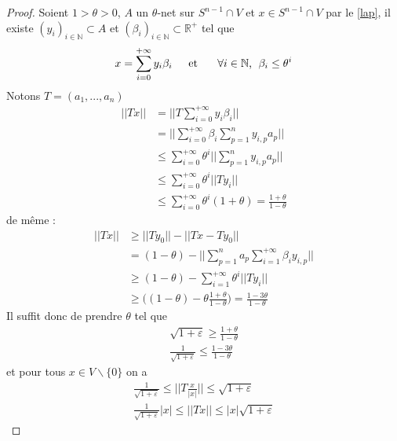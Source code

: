 \documentclass[12pt]{article}
\theoremstyle{definition}
\begin{document}
\begin{proof} 
	Soient $1>\theta>0$, $A$ un $\theta$-net sur $S^{n-1}\cap V$ et $x\in S^{n-1}\cap V$ par le \cref{lap},  il existe $(y_i)_{i\in\mathbb{N}}\subset A$ et $(\beta_i)_{i\in\mathbb{N}}\subset \mathbb{R}^{+}$ tel que 
	\begin{equation*}
	x = \sum_{i=0}^{+\infty}y_i \beta_i \text{\hspace{4mm} et \hspace{4mm} $\forall i\in \mathbb{N}$, }\; \beta_i\leq \theta^i
	\end{equation*}
	Notons $T=(a_1,...,a_n)$
	\begin{align*}
	||Tx|| &= \big|\big| T\sum_{i=0}^{+\infty}y_i \beta_i\big|\big|\\
	&=  \big|\big| \sum_{i=0}^{+\infty}\beta_i \sum_{p=1}^{n}y_{i,p}a_p \big|\big|\\
	&\leq \sum_{i=0}^{+\infty}\theta^i ||\sum_{p=1}^{n}y_{i,p}a_p||\\
	&\leq \sum_{i=0}^{+\infty}\theta^i ||Ty_i||\\
	& \leq  \sum_{i=0}^{+\infty}\theta^i (1+\theta)=\frac{1+\theta}{1-\theta}
	\end{align*}
	de même :
	\begin{align*}
	||Tx|| &\geq||Ty_0||- ||Tx-Ty_0||\\
	&= (1-\theta) - ||\sum_{p=1}^{n}a_p\sum_{i=1}^{+\infty}\beta_i y_{i,p}||\\
	&\geq (1-\theta)- \sum_{i=1}^{+\infty}\theta^i ||Ty_i||\\
	&\geq \big((1-\theta)- \theta\frac{1+\theta}{1-\theta}\big)=  \frac{1-3\theta}{1-\theta}
	\end{align*}
	Il suffit donc de prendre $\theta$ tel que
	\begin{equation*}
	\begin{array}{cc}
	\sqrt{1+\varepsilon}\geq \frac{1+\theta}{1-\theta}\\
	\frac{1}{\sqrt{1+\varepsilon}}\leq \frac{1-3\theta}{1-\theta}
	\end{array}
	\end{equation*}
	et pour tous $x\in V \backslash\{0\}$ on a 
	\begin{equation*}
	\begin{array}{cc}
	\frac{1}{\sqrt{1+\varepsilon}}\leq\big|\big|T\frac{x}{|x|}\big|\big|\leq  \sqrt{1+\varepsilon}\\
	\frac{1}{\sqrt{1+\varepsilon}}|x|\leq||Tx||\leq |x|\sqrt{1+\varepsilon}
	\end{array}
	\end{equation*}

\end{proof}
\end{document}

